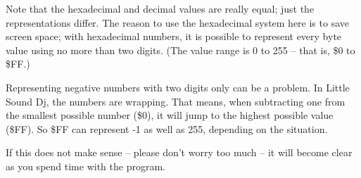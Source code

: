 Note that the hexadecimal and decimal values are really equal; just the representations differ.
The reason to use the hexadecimal system here is to save screen space; with hexadecimal
numbers, it is possible to represent every byte value using no more than two digits. (The
value range is 0 to 255 -- that is, \$0 to \$FF.)

Representing negative numbers with two digits only can be a problem. In Little Sound Dj,
the numbers are wrapping. That means, when subtracting one from the smallest possible
number (\$0), it will jump to the highest possible value (\$FF). So \$FF can represent -1 as well as 255, depending on the situation.

If this does not make sense -- please don't worry too much -- it will become clear as you spend time with the program.
